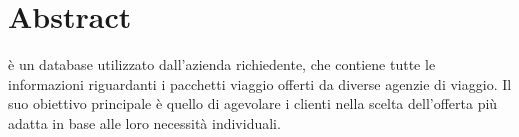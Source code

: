 \section{Abstract}
\app è un database utilizzato dall'azienda richiedente, che contiene tutte le informazioni riguardanti i pacchetti viaggio offerti da diverse agenzie di viaggio. Il suo obiettivo principale è quello di agevolare i clienti nella scelta dell'offerta più adatta in base alle loro necessità individuali.
